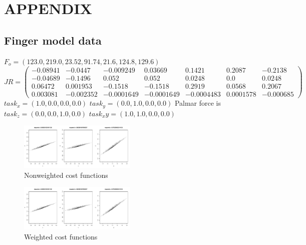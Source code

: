 \section{APPENDIX}

\subsection{Finger model data}
$F_o = (123.0, 219.0, 23.52, 91.74,	21.6, 124.8, 129.6)$\\
$
JR = 
\begin{pmatrix}
-0.08941 & -0.0447 & -0.009249 & 0.03669 & 0.1421 & 0.2087 & -0.2138 \\
-0.04689 & -0.1496 & 0.052 &0.052 & 0.0248 & 0.0 & 0.0248 \\ 
0.06472 & 0.001953 & -0.1518 &-0.1518 & 0.2919 & 0.0568 & 0.2067 \\
0.003081 & -0.002352 & -0.0001649 & -0.0001649 & -0.0004483 & 0.0001578 & -0.000685
\end{pmatrix}
$
$task_x = (1.0,0.0,0.0,0.0)$
$task_y = (0.0,1.0,0.0,0.0)$
Palmar force is $task_z = (0.0,0.0,1.0,0.0)$
$task_xy = (1.0,1.0,0.0,0.0)$

\begin{figure}[h]
\centering
\includegraphics[width=0.5\textwidth,page=1]{figs/cost_function_scatterplots.pdf}
\caption{Nonweighted cost functions}
\label{fig:unweighted_cost_functions}
\end{figure}

\begin{figure}[h]
\centering
\includegraphics[width=0.5\textwidth,page=2]{figs/cost_function_scatterplots.pdf}
\caption{Weighted cost functions}
\label{fig:weighted_cost_functions}
\end{figure}
